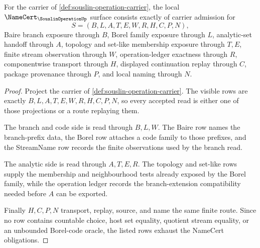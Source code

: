 \begin{theorem}
\label{thm:souslin-operation-namecert-obligations}
For the carrier of \autoref{def:souslin-operation-carrier}, the local $\NameCert_{\SouslinOperationUp}$ surface consists exactly of carrier admission for
$$
S=(B,L,A,T,E,W,R,H,C,P,N),
$$
Baire branch exposure through $B$, Borel family exposure through $L$, analytic-set handoff through $A$, topology and set-like membership exposure through $T,E$, finite stream observation through $W$, operation-ledger exactness through $R$, componentwise transport through $H$, displayed continuation replay through $C$, package provenance through $P$, and local naming through $N$.
\end{theorem}
\begin{proof}
Project the carrier of \autoref{def:souslin-operation-carrier}. The visible rows are exactly $B,L,A,T,E,W,R,H,C,P,N$, so every accepted read is either one of those projections or a route replaying them.

The branch and code side is read through $B,L,W$. The Baire row names the branch-prefix data, the Borel row attaches a code family to those prefixes, and the StreamName row records the finite observations used by the branch read.

The analytic side is read through $A,T,E,R$. The topology and set-like rows supply the membership and neighbourhood tests already exposed by the Borel family, while the operation ledger records the branch-extension compatibility needed before $A$ can be exported.

Finally $H,C,P,N$ transport, replay, source, and name the same finite route. Since no row contains countable choice, host set equality, quotient stream equality, or an unbounded Borel-code oracle, the listed rows exhaust the NameCert obligations.
\end{proof}

